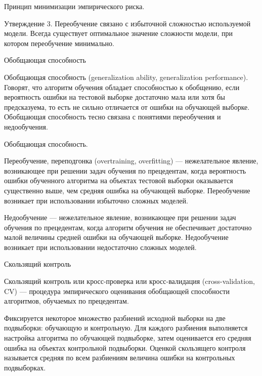 \documentclass{beamer}
\begin{document}
\begin{frame}{Принцип минимизации эмпирического риска.}

Утверждение 3. Переобучение связано с избыточной сложностью используемой модели. Всегда существует оптимальное значение сложности модели, при котором переобучение минимально. 

\end{frame}

\begin{frame}{Обобщающая способность}

Обобщающая способность (generalization ability, generalization performance). Говорят, что алгоритм обучения обладает способностью к обобщению, если вероятность ошибки на тестовой выборке достаточно мала или хотя бы предсказуема, то есть не сильно отличается от ошибки на обучающей выборке. Обобщающая способность тесно связана с понятиями переобучения и недообучения.
\end{frame}

\begin{frame}{Обобщающая способность.}

Переобучение, переподгонка (overtraining, overfitting) — нежелательное явление, возникающее при решении задач обучения по прецедентам, когда вероятность ошибки обученного алгоритма на объектах тестовой выборки оказывается существенно выше, чем средняя ошибка на обучающей выборке. Переобучение возникает при использовании избыточно сложных моделей.

Недообучение — нежелательное явление, возникающее при решении задач обучения по прецедентам, когда алгоритм обучения не обеспечивает достаточно малой величины средней ошибки на обучающей выборке. Недообучение возникает при использовании недостаточно сложных моделей. 

\end{frame}

\begin{frame}{Скользящий контроль}

Скользящий контроль или кросс-проверка или кросс-валидация (cross-validation, CV) — процедура эмпирического оценивания обобщающей способности алгоритмов, 
обучаемых по прецедентам.

Фиксируется некоторое множество разбиений исходной выборки на две подвыборки: обучающую и контрольную. Для каждого разбиения выполняется 
настройка алгоритма по обучающей подвыборке, затем оценивается его средняя ошибка на объектах контрольной подвыборки.
Оценкой скользящего контроля называется средняя по всем разбиениям величина ошибки на контрольных подвыборках.

\end{frame}
\end{document}
